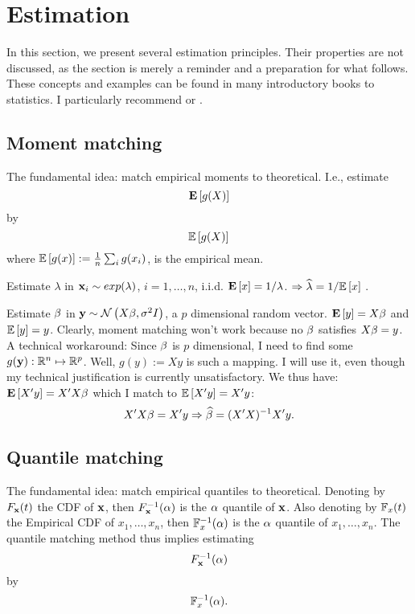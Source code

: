 
\chapter{Estimation}
\label{sec:estimation} 

In this section, we present several estimation principles. 
Their properties are not discussed, as the section is merely a reminder and a preparation for what follows.
These concepts and examples can be found in many introductory books to statistics. I particularly recommend \cite{wasserman_all_2004} or \cite{abramovich_statistical_2013}.

\section{Moment matching}
\label{sec:moment_matching}

The fundamental idea: match empirical moments to theoretical. I.e., estimate
$$ \mathbf{E}\left[ g(X) \right]   $$
by 
$$ \mathbb{E}\left[g(X)\right]   $$
where $\mathbb{E}\left[g(x)\right]:=\frac{1}{n}  \sum_i g(x_i)$, is the empirical mean.

\begin{example}

Estimate $\lambda$ in $\mathbf{x}_i \sim exp(\lambda)$, $i=1,\dots,n$, i.i.d.
$\mathbf{E}\left[ x \right]=1/\lambda$.
$\Rightarrow \widehat{\lambda}=1/\mathbb{E}\left[x\right]$ .

\end{example}


\begin{example}

Estimate $\beta$ in $\mathbf{y} \sim \mathcal{N}\left(X\beta,\sigma^2 I\right)$, a $p$ dimensional random vector.
$\mathbf{E}\left[ y \right]=X\beta$ and $\mathbb{E}\left[y\right]=y$.
Clearly, moment matching won't work because no $\beta$ satisfies $X\beta=y$.
A technical workaround:
Since $\beta$ is $p$ dimensional, I need to find some $g(\mathbf{y}): \mathbb{R}^n \mapsto \mathbb{R}^p$.
Well, $g(y):=Xy$ is such a mapping. I will use it, even though my technical justification is currently unsatisfactory. We thus have:
$\mathbf{E}\left[ X'y \right]=X'X\beta$ which I match to $\mathbb{E}\left[X'y\right]=X'y$:
$$
  X'X \beta = X' y \Rightarrow \widehat{\beta}=(X'X)^{-1} X'y.
$$

\end{example}


\section{Quantile matching}
\label{sec:quantiles}

The fundamental idea: match empirical quantiles to theoretical. 
Denoting by $F_{\mathbf{x}} (t)$ the CDF of $\mathbf{x}$, then $F_{\mathbf{x}}^{-1} (\alpha)$ is the $\alpha$ quantile of $\mathbf{x}$.
Also denoting by $\mathbb{F}_{x}(t)$ the Empirical CDF of $x_1,\dots, x_n$, then $\mathbb{F}^{-1}_{x}(\alpha)$ is the $\alpha$ quantile of $x_1,\dots, x_n$.
The quantile matching method thus implies estimating
$$ F_{\mathbf{x}}^{-1} (\alpha) $$
by 
$$ \mathbb{F}^{-1}_{x}(\alpha)  . $$

